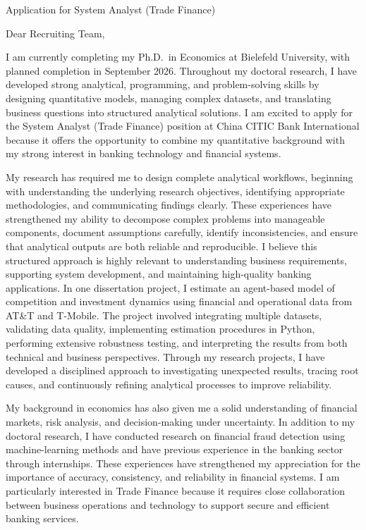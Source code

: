 \documentclass[11pt]{article}
\begin{document}
\vspace{0.1cm}

\noindent
Application for System Analyst (Trade Finance)

\vspace{0.05cm}

\noindent Dear Recruiting Team,

I am currently completing my Ph.D.\ in Economics at Bielefeld University, with planned completion in September 2026. Throughout my doctoral research, I have developed strong analytical, programming, and problem-solving skills by designing quantitative models, managing complex datasets, and translating business questions into structured analytical solutions. I am excited to apply for the System Analyst (Trade Finance) position at China CITIC Bank International because it offers the opportunity to combine my quantitative background with my strong interest in banking technology and financial systems.

My research has required me to design complete analytical workflows, beginning with understanding the underlying research objectives, identifying appropriate methodologies, and communicating findings clearly. These experiences have strengthened my ability to decompose complex problems into manageable components, document assumptions carefully, identify inconsistencies, and ensure that analytical outputs are both reliable and reproducible. I believe this structured approach is highly relevant to understanding business requirements, supporting system development, and maintaining high-quality banking applications.
In one dissertation project, I estimate an agent-based model of competition and investment dynamics using financial and operational data from AT\&T and T-Mobile. The project involved integrating multiple datasets, validating data quality, implementing estimation procedures in Python, performing extensive robustness testing, and interpreting the results from both technical and business perspectives. Through my research projects, I have developed a disciplined approach to investigating unexpected results, tracing root causes, and continuously refining analytical processes to improve reliability.

My background in economics has also given me a solid understanding of financial markets, risk analysis, and decision-making under uncertainty. In addition to my doctoral research, I have conducted research on financial fraud detection using machine-learning methods and have previous experience in the banking sector through internships. These experiences have strengthened my appreciation for the importance of accuracy, consistency, and reliability in financial systems. I am particularly interested in Trade Finance because it requires close collaboration between business operations and technology to support secure and efficient banking services.
\end{document}
